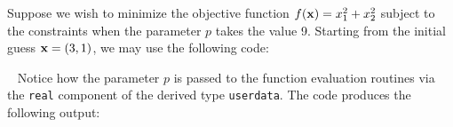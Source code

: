 \documentclass{galahad}
\newcommand{\package}{expo}
\begin{document}
\galexamples
Suppose we wish to minimize the objective function
$f({\mathbf{x}}) = x_1^2 + x_2^2$ subject to the constraints
when the parameter $p$ takes the value 9.
Starting from the initial guess ${\mathbf{x}} = (3,1)$, we may use the following code:

\renewcommand{\packagedir}{\galahaddir/src/forthcoming/\package}
{\tt \small
\VerbatimInput{\packageexample}
}
\noindent
Notice how the parameter $p$ is passed to the function evaluation
routines via the {\tt real} component of the derived type {\tt userdata}.
The code produces the following output:
{\tt \small
\VerbatimInput{\packageresults}
}
\noindent
\end{document}
